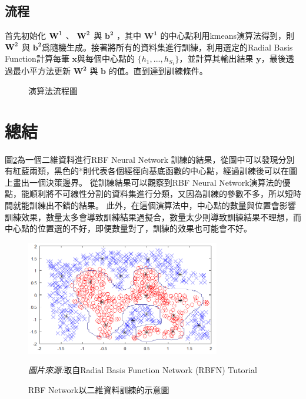 \subsection{流程}

首先初始化 \(\textbf W^1\)  、 \(\textbf W^2\) 與 \(\mathbf{b^2}\) ，其中 \(\mathbf{W^1}\) 的中心點利用kmeans演算法得到，則\(\textbf W^2\) 與 \(\mathbf{b^2}\)爲隨機生成。接著將所有的資料集進行訓練，利用選定的Radial Basis Function計算每筆 \(\mathbf x\)與每個中心點的 \(\{h_1,...,h_{S_1}\}\)，並計算其輸出結果 \(\mathbf{y}\)，最後透過最小平方法更新 \(\mathbf{W^2}\) 與 \(\mathbf{b}\) 的值。直到達到訓練條件。

\begin{figure}[H]
	\centering
	
	\caption{演算法流程圖}
	\label{fig:AlogrithmWorkflow}
\end{figure}

\section {總結}
圖\ref{fig:RbfOutcome}為一個二維資料進行RBF Neural Network 訓練的結果，從圖中可以發現分別有紅藍兩類，黑色的*則代表各個經徑向基底函數的中心點，經過訓練後可以在圖上畫出一個決策邊界。
從訓練結果可以觀察到RBF Neural Network演算法的優點，能順利將不可線性分割的資料集進行分類，又因為訓練的參數不多，所以短時間就能訓練出不錯的結果。
\newpage
此外，在這個演算法中，中心點的數量與位置會影響訓練效果，數量太多會導致訓練結果過擬合，數量太少則導致訓練結果不理想，而中心點的位置選的不好，即便數量對了，訓練的效果也可能會不好。




\begin{figure}[h]
	\centering
	\includegraphics[height=5cm]{./pic/v35Qta6w.png}
	\caption{RBF Network以二維資料訓練的示意圖}

	\begin{minipage}{.7\linewidth}
		\centering
		\footnotesize
		\emph{圖片來源:}取自Radial Basis Function Network (RBFN) Tutorial
	\end{minipage}

	\label{fig:RbfOutcome}
\end{figure}
